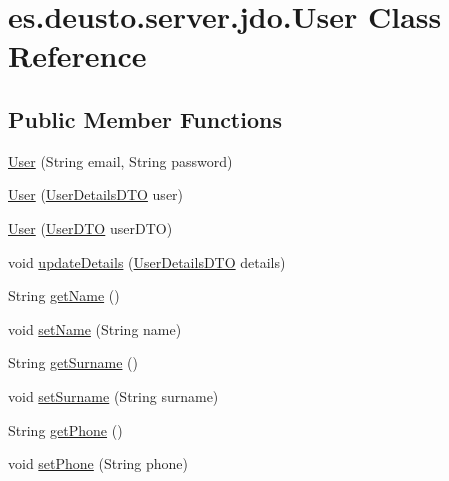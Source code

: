 \hypertarget{classes_1_1deusto_1_1server_1_1jdo_1_1_user}{}\section{es.\+deusto.\+server.\+jdo.\+User Class Reference}
\label{classes_1_1deusto_1_1server_1_1jdo_1_1_user}
\subsection*{Public Member Functions}
\begin{DoxyCompactItemize}
\item 
\mbox{\hyperlink{classes_1_1deusto_1_1server_1_1jdo_1_1_user_a3c1d7bfbedde3bad6bed8ccd3288072d}{User}} (String email, String password)
\item 
\mbox{\hyperlink{classes_1_1deusto_1_1server_1_1jdo_1_1_user_a045d3217e3e459cd505de75ebb88243e}{User}} (\mbox{\hyperlink{classes_1_1deusto_1_1server_1_1data_1_1_user_details_d_t_o}{User\+Details\+D\+TO}} user)
\item 
\mbox{\hyperlink{classes_1_1deusto_1_1server_1_1jdo_1_1_user_aba393844e4f390b5756de0058777f9a5}{User}} (\mbox{\hyperlink{classes_1_1deusto_1_1server_1_1data_1_1_user_d_t_o}{User\+D\+TO}} user\+D\+TO)
\item 
void \mbox{\hyperlink{classes_1_1deusto_1_1server_1_1jdo_1_1_user_a2abb7df132d0ded1f4187d900416d65d}{update\+Details}} (\mbox{\hyperlink{classes_1_1deusto_1_1server_1_1data_1_1_user_details_d_t_o}{User\+Details\+D\+TO}} details)
\item 
String \mbox{\hyperlink{classes_1_1deusto_1_1server_1_1jdo_1_1_user_ae241c2d5fbef940165041c82dc00edad}{get\+Name}} ()
\item 
void \mbox{\hyperlink{classes_1_1deusto_1_1server_1_1jdo_1_1_user_a1684a5a2d021ec4c3137a46a4e76d0c7}{set\+Name}} (String name)
\item 
String \mbox{\hyperlink{classes_1_1deusto_1_1server_1_1jdo_1_1_user_adc7114247c7881e3f9e0fd14b7905f9a}{get\+Surname}} ()
\item 
void \mbox{\hyperlink{classes_1_1deusto_1_1server_1_1jdo_1_1_user_ae429a21d0538859e2300e94ef0a9257a}{set\+Surname}} (String surname)
\item 
String \mbox{\hyperlink{classes_1_1deusto_1_1server_1_1jdo_1_1_user_a9ad4609fbf59521908115b9c49d903f4}{get\+Phone}} ()
\item 
void \mbox{\hyperlink{classes_1_1deusto_1_1server_1_1jdo_1_1_user_a2c330811de99729fb430ffe41be0540a}{set\+Phone}} (String phone)

\end{DoxyCompactItemize}
